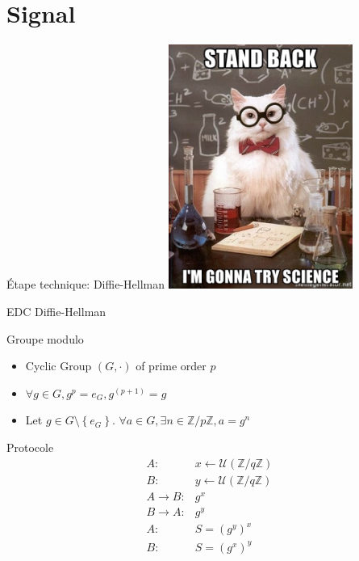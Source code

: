 \documentclass{beamer}
\newcommand{\ZZ}{\mathbb{Z}}
\newcommand{\Uu}{\mathcal{U}}
\newcommand{\la}{\leftarrow}
\newcommand{\ra}{\rightarrow}
\newcommand{\set}[1]{\left\{ #1 \right\}}
\begin{document}
\section{Signal}
\begin{frame}{Étape technique: Diffie-Hellman}
	\center
	\includegraphics[height=8cm]{img/stand-back-im-gonna-try-science.jpg}
\end{frame}

\begin{frame}{EDC Diffie-Hellman}
	\begin{block}{Groupe modulo}
		\begin{itemize}
			\item Cyclic Group $(G, \cdot)$ of prime order $p$
			\item $\forall g \in G, g^p = e_G, g^{(p+1)} = g$
			\item Let $g \in G\setminus \set{e_G}$. $\forall a \in G, \exists n \in \ZZ / p\ZZ, a = g^n$
		\end{itemize}
	\end{block}

	\pause

	\begin{block}{Protocole}
	$$
    \begin{array}{rl}
      A :       & x \la \Uu(\ZZ / q\ZZ) \\
      B :       & y \la \Uu(\ZZ / q\ZZ) \\
      A \ra B : & g^x                   \\
      B \ra A : & g^y                   \\
      A :       & S = (g^y)^x           \\
      B :       & S = (g^x)^y           
    \end{array}
   $$
	\end{block}

\end{frame}
\end{document}
